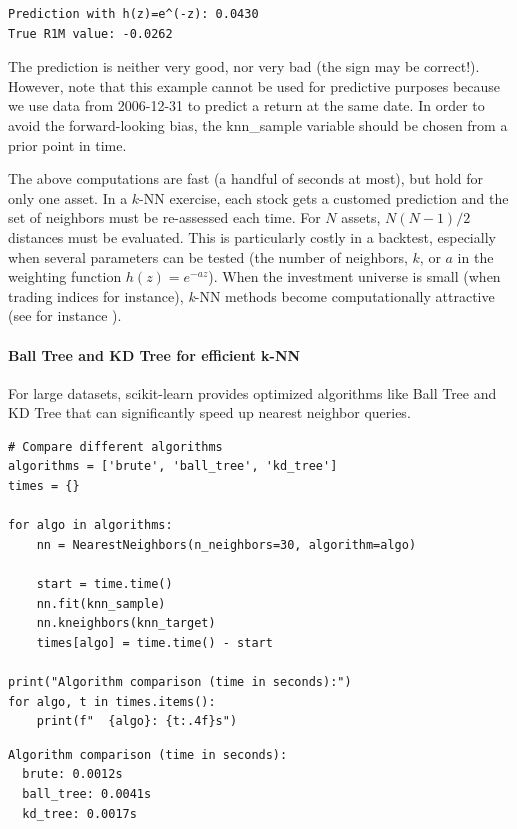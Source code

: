 \begin{verbatim}
Prediction with h(z)=e^(-z): 0.0430
True R1M value: -0.0262
\end{verbatim}

The prediction is neither very good, nor very bad (the sign may be correct!). However, note that this example cannot be used for predictive purposes because we use data from 2006-12-31 to predict a return at the same date. In order to avoid the forward-looking bias, the knn\_sample variable should be chosen from a prior point in time.

The above computations are fast (a handful of seconds at most), but hold for only one asset. In a $k$-NN exercise, each stock gets a customed prediction and the set of neighbors must be re-assessed each time. For $N$ assets, $N(N -1)/2$ distances must be evaluated. This is particularly costly in a backtest, especially when several parameters can be tested (the number of neighbors, $k$, or $a$ in the weighting function $h(z)=e^{ -az}$). When the investment universe is small (when trading indices for instance), \textit{k}-NN methods become computationally attractive (see for instance \cite{chen2017feature}).

\paragraph{Ball Tree and KD Tree for efficient k-NN}

For large datasets, scikit-learn provides optimized algorithms like Ball Tree and KD Tree that can significantly speed up nearest neighbor queries.

\begin{verbatim}
# Compare different algorithms
algorithms = ['brute', 'ball_tree', 'kd_tree']
times = {}

for algo in algorithms:
    nn = NearestNeighbors(n_neighbors=30, algorithm=algo)
    
    start = time.time()
    nn.fit(knn_sample)
    nn.kneighbors(knn_target)
    times[algo] = time.time() - start

print("Algorithm comparison (time in seconds):")
for algo, t in times.items():
    print(f"  {algo}: {t:.4f}s")
\end{verbatim}

\begin{verbatim}
Algorithm comparison (time in seconds):
  brute: 0.0012s
  ball_tree: 0.0041s
  kd_tree: 0.0017s
\end{verbatim}

